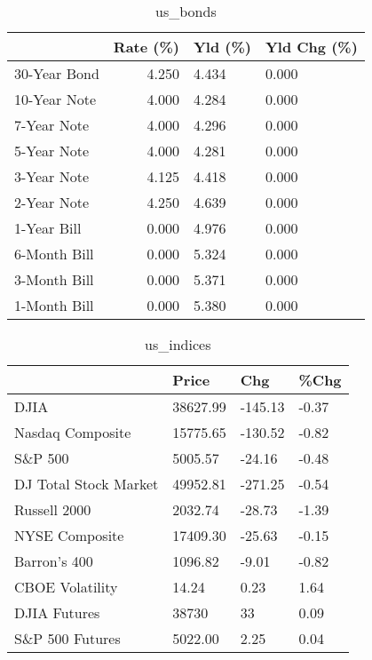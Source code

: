 \documentclass{article}%
\begin{document}
%


\begin{table}[htbp]%
\caption{us\_bonds}%
\centering%
\begin{adjustbox}{width=1\textwidth}%
\begin{tabular}{lrll}
\toprule
             &  Rate (\%) & Yld (\%) & Yld Chg (\%) \\
\midrule
30-Year Bond &     4.250 &   4.434 &       0.000 \\
10-Year Note &     4.000 &   4.284 &       0.000 \\
 7-Year Note &     4.000 &   4.296 &       0.000 \\
 5-Year Note &     4.000 &   4.281 &       0.000 \\
 3-Year Note &     4.125 &   4.418 &       0.000 \\
 2-Year Note &     4.250 &   4.639 &       0.000 \\
 1-Year Bill &     0.000 &   4.976 &       0.000 \\
6-Month Bill &     0.000 &   5.324 &       0.000 \\
3-Month Bill &     0.000 &   5.371 &       0.000 \\
1-Month Bill &     0.000 &   5.380 &       0.000 \\
\bottomrule
\end{tabular}
%
\end{adjustbox}%
\end{table}

%


\begin{table}[htbp]%
\caption{us\_indices}%
\centering%
\begin{adjustbox}{width=1\textwidth}%
\begin{tabular}{llll}
\toprule
                      &    Price &     Chg &  \%Chg \\
\midrule
                 DJIA & 38627.99 & -145.13 & -0.37 \\
     Nasdaq Composite & 15775.65 & -130.52 & -0.82 \\
              S\&P 500 &  5005.57 &  -24.16 & -0.48 \\
DJ Total Stock Market & 49952.81 & -271.25 & -0.54 \\
         Russell 2000 &  2032.74 &  -28.73 & -1.39 \\
       NYSE Composite & 17409.30 &  -25.63 & -0.15 \\
         Barron's 400 &  1096.82 &   -9.01 & -0.82 \\
      CBOE Volatility &    14.24 &    0.23 &  1.64 \\
         DJIA Futures &    38730 &      33 &  0.09 \\
      S\&P 500 Futures &  5022.00 &    2.25 &  0.04 \\
\bottomrule
\end{tabular}
%
\end{adjustbox}%
\end{table}
\end{document}
